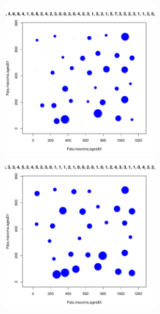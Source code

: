 \documentclass[12pt, a4paper]{disser}
\begin{document}
\begin{figure}[h]
	
	\begin{minipage}[b]{.46\linewidth}
	\begin{center}
	\includegraphics[width=65mm]{./Pala_macoma_age_bubb_N9_.pdf}

	\end{center}
	\end{minipage}
	\hfil %
	\begin{minipage}[b]{.46\linewidth}
	\begin{center}
		\includegraphics[width=65mm]{./Pala_macoma_age_bubb_N10_.pdf}
	\end{center}
	\end{minipage}






\end{figure}
\end{document}

